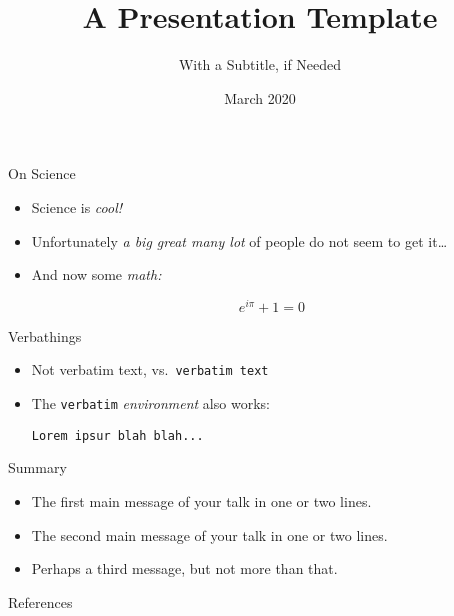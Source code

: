 \documentclass{beamer}
\title
{A Presentation Template}
\subtitle
{With a Subtitle, if Needed}
\date
{March 2020}
\begin{document}
\begin{frame}[plain]
  \titlepage
\end{frame}

\begin{frame}{On Science}
  \vfill
  \begin{itemize}
    \item<1-> Science is \emph{cool!} \citep{Sagan}
      \vfill
    \item<2-> Unfortunately \emph{a big great many lot} of people do not seem to get it\dots \citep{Feynman74}
      \vfill
    \item<3-> And now some \emph{math:}
      \vfill
      \begin{theorem} %
        \begin{equation}
          e^{i\pi}+1=0
        \end{equation}
      \end{theorem}
  \end{itemize}
  \vfill
\end{frame}

\begin{frame}[fragile]{Verbathings}
  \begin{itemize}
    \item Not verbatim text, vs.\ \verb+verbatim text+
    \item The \verb+verbatim+ \emph{environment} also works:
      \begin{verbatim}
Lorem ipsur blah blah...
      \end{verbatim}
  \end{itemize}
\end{frame}

\begin{frame}{Summary}
  \begin{itemize}
  \item
    The \alert{first main message} of your talk in one or two lines.
  \item
    The \alert{second main message} of your talk in one or two lines.
  \item
    Perhaps a \alert{third message}, but not more than that.
  \end{itemize}
\end{frame}

\begin{frame}{References}
  \vfill
  
  
  \vfill
\end{frame}
\end{document}
